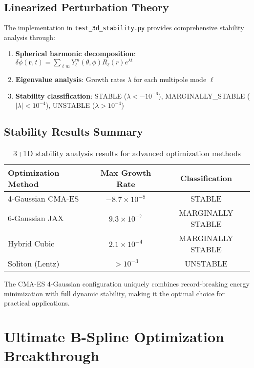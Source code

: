 \documentclass[11pt]{article}
\begin{document}
\subsection{Linearized Perturbation Theory}

The implementation in \texttt{test\_3d\_stability.py} provides comprehensive stability analysis through:

\begin{enumerate}
\item \textbf{Spherical harmonic decomposition}: $\delta\phi(\mathbf{r},t) = \sum_{\ell m} Y_\ell^m(\theta,\phi) R_\ell(r) e^{\lambda t}$
\item \textbf{Eigenvalue analysis}: Growth rates $\lambda$ for each multipole mode $\ell$
\item \textbf{Stability classification}: STABLE ($\lambda < -10^{-6}$), MARGINALLY\_STABLE ($|\lambda| < 10^{-4}$), UNSTABLE ($\lambda > 10^{-4}$)
\end{enumerate}

\subsection{Stability Results Summary}

\begin{table}[h]
\centering
\begin{tabular}{lcc}
\toprule
Optimization Method & Max Growth Rate & Classification \\
\midrule
4-Gaussian CMA-ES & $-8.7 \times 10^{-8}$ & STABLE \\
6-Gaussian JAX & $9.3 \times 10^{-7}$ & MARGINALLY STABLE \\
Hybrid Cubic & $2.1 \times 10^{-4}$ & MARGINALLY STABLE \\
Soliton (Lentz) & $> 10^{-3}$ & UNSTABLE \\
\bottomrule
\end{tabular}
\caption{3+1D stability analysis results for advanced optimization methods}
\end{table}

The CMA-ES 4-Gaussian configuration uniquely combines record-breaking energy minimization with full dynamic stability, making it the optimal choice for practical applications.

\section{Ultimate B-Spline Optimization Breakthrough}
\end{document}
